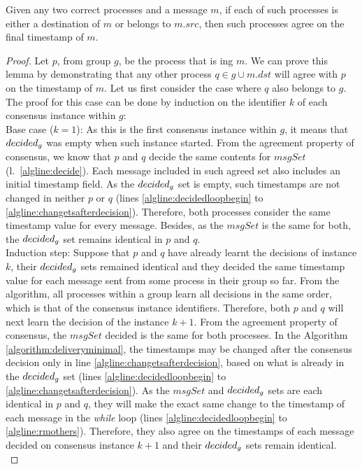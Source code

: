 \documentclass[times, 10pt]{article}
\begin{document}
\begin{lems} \label{lemma:agreetimestamps}
Given any two correct processes and a message $m$, if each of such processes is either a destination of $m$ or belongs to $m.src$, then such processes agree on the final timestamp of $m$.
\end{lems}

\begin{proof}
Let $p$, from group $g$, be the process that is \amcast{}ing $m$. We can prove this lemma by demonstrating that any other process $q \in g \cup m.dst$ will agree with $p$ on the timestamp of $m$. Let us first consider the case where $q$ also belongs to $g$. The proof for this case can be done by induction on the identifier $k$ of each consensus instance within $g$:\\

\noindent Base case ($k=1$): As this is the first consensus instance within $g$, it means that $decided\text{$_g$}$ was empty when such instance started. From the agreement property of consensus, we know that $p$ and $q$ decide the same contents for $msgSet$ \mbox{(l. \ref{algline:decide})}. Each message included in such agreed set also includes an initial timestamp field. As the $decided\text{$_g$}$ set is empty, such timestamps are not changed in neither $p$ or $q$ (lines \ref{algline:decidedloopbegin} to \ref{algline:changetsafterdecision}). Therefore, both processes consider the same timestamp value for every message. Besides, as the $msgSet$ is the same for both, the $decided\text{$_g$}$ set remains identical in $p$ and $q$.\\

\noindent Induction step: Suppose that $p$ and $q$ have already learnt the decisions of instance $k$, their $decided\text{$_g$}$ sets remained identical and they decided the same timestamp value for each message sent from some process in their group so far. From the algorithm, all processes within a group learn all decisions in the same order, which is that of the consensus instance identifiers. Therefore, both $p$ and $q$ will next learn the decision of the instance $k+1$. From the agreement property of consensus, the $msgSet$ decided is the same for both processes. In the Algorithm \ref{algorithm:deliveryminimal}, the timestamps may be changed after the consensus decision only in line \ref{algline:changetsafterdecision}, based on what is already in the $decided\text{$_g$}$ set (lines \ref{algline:decidedloopbegin} to \ref{algline:changetsafterdecision}). As the $msgSet$ and $decided\text{$_g$}$ sets are each identical in $p$ and $q$, they will make the exact same change to the timestamp of each message in the \textit{while} loop (lines \ref{algline:decidedloopbegin} to \ref{algline:rmothers}). Therefore, they also agree on the timestamps of each message decided on consensus instance $k+1$ and their $decided\text{$_g$}$ sets remain identical.\\


\end{proof}
\end{document}
